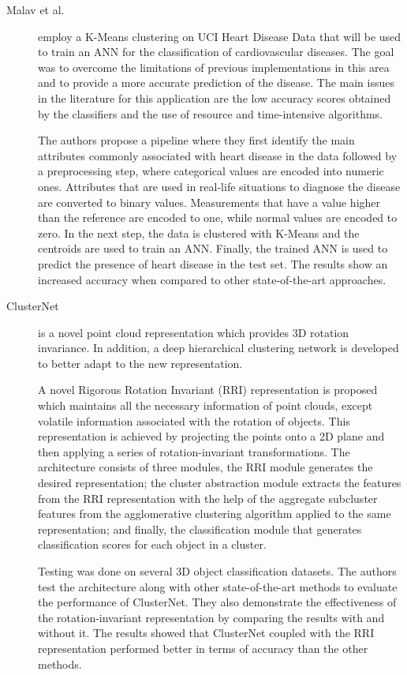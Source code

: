 \begin{description}
    \item[Malav et al.]\cite{Malav.Kadam.ea_PREDICTIONHEARTDISEASE_2017} employ a K-Means clustering on UCI Heart Disease Data that will be used to train an ANN for the classification of cardiovascular diseases. The goal was to overcome the limitations of previous implementations in this area and to provide a more accurate prediction of the disease. The main issues in the literature for this application are the low accuracy scores obtained by the classifiers and the use of resource and time-intensive algorithms.
    
    The authors propose a pipeline where they first identify the main attributes commonly associated with heart disease in the data followed by a preprocessing step, where categorical values are encoded into numeric ones. Attributes that are used in real-life situations to diagnose the disease are converted to binary values. Measurements that have a value higher than the reference are encoded to one, while normal values are encoded to zero. In the next step, the data is clustered with K-Means and the centroids are used to train an ANN. Finally, the trained ANN is used to predict the presence of heart disease in the test set. The results show an increased accuracy when compared to other state-of-the-art approaches.
\end{description}

\begin{description}
    \item[ClusterNet]\cite{Chen.Li.ea_ClusterNetDeepHierarchical_2019} is a novel point cloud representation which provides 3D rotation invariance. In addition, a deep hierarchical clustering network is developed to better adapt to the new representation.
    
    A novel Rigorous Rotation Invariant (RRI) representation is proposed which maintains all the necessary information of point clouds, except volatile information associated with the rotation of objects. This representation is achieved by projecting the points onto a 2D plane and then applying a series of rotation-invariant transformations. The architecture consists of three modules, the RRI module generates the desired representation; the cluster abstraction module extracts the features from the RRI representation with the help of the aggregate subcluster features from the agglomerative clustering algorithm applied to the same representation; and finally, the classification module that generates classification scores for each object in a cluster.

    Testing was done on several 3D object classification datasets. The authors test the architecture along with other state-of-the-art methods to evaluate the performance of ClusterNet. They also demonstrate the effectiveness of the rotation-invariant representation by comparing the results with and without it. The results showed that ClusterNet coupled with the RRI representation performed better in terms of accuracy than the other methods.
\end{description}

